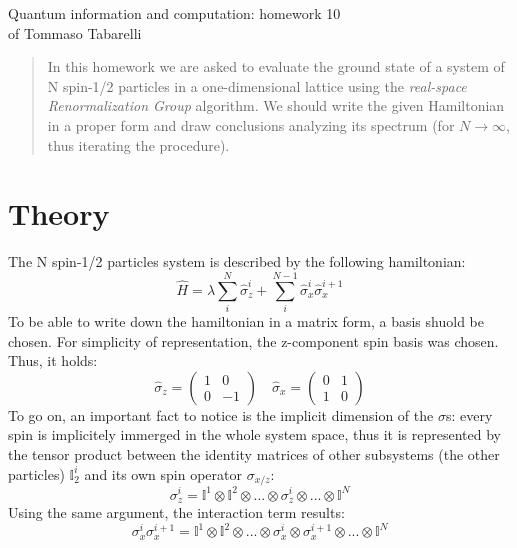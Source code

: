 \documentclass[12pt, a4paper, notitlepage]{report}
\begin{document}
\begin{center}
	\LARGE{Quantum information and computation: homework 10}\\
	\Large{of Tommaso Tabarelli}
\end{center}


\begin{abstract}
	In this homework we are asked to evaluate the ground state of a system of N spin-1/2 particles in a one-dimensional lattice using the \textit{real-space Renormalization Group} algorithm. We should write the given Hamiltonian in a proper form and draw conclusions analyzing its spectrum (for $N \to \infty$, thus iterating the procedure).
\end{abstract}

\section*{Theory}

The N spin-1/2 particles system is described by the following hamiltonian:
\begin{equation}
\hat{H} = \lambda \sum_{i}^{N} \hat{\sigma}_z^i + \sum_{i}^{N-1} \hat{\sigma}_x^i \hat{\sigma}_x^{i+1}
\end{equation}
To be able to write down the hamiltonian in a matrix form, a basis shuold be chosen. For simplicity of representation, the z-component spin basis was chosen. Thus, it holds:
\begin{equation}
	\hat{\sigma}_z = \left(
	\begin{matrix}
		1 & 0 \\
		0 & -1
	\end{matrix} \right)
	\quad
	\hat{\sigma}_x = \left(
	\begin{matrix}
		0 & 1 \\
		1 & 0
	\end{matrix}
	\right)
\end{equation}
To go on, an important fact to notice is the implicit dimension of the $\sigma$s: every spin is implicitely immerged in the whole system space, thus it is represented by the tensor product between the identity matrices of other subsystems (the other particles) $\mathbb{I}_2^i$ and its own spin operator $\sigma_{x/z}$:
\begin{equation}
\sigma_z^i = \mathbb{I}^1 \otimes \mathbb{I}^2 \otimes ... \otimes \sigma_z^i \otimes ... \otimes \mathbb{I}^N
\end{equation}
Using the same argument, the interaction term results:
\begin{equation}
	\sigma_x^i \sigma_x^{i+1} = \mathbb{I}^1 \otimes \mathbb{I}^2 \otimes ... \otimes \sigma_x^i \otimes \sigma_x^{i+1} \otimes ... \otimes \mathbb{I}^N
\end{equation}
\end{document}
